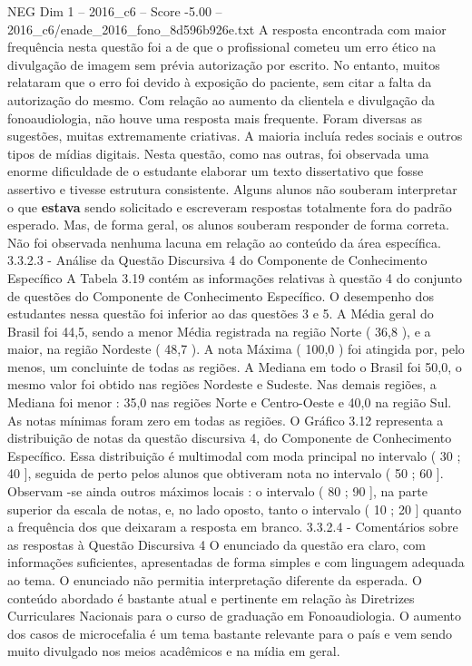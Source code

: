 \begin{textsample}{NEG Dim 1 – 2016\_c6 – Score -5.00 – 2016\_c6/enade\_2016\_fono\_8d596b926e.txt}
A resposta encontrada com maior frequência nesta questão foi a de que o profissional cometeu um erro ético na divulgação de imagem sem prévia autorização por escrito.
No entanto, muitos relataram que o erro foi devido à exposição do paciente, sem citar a falta da autorização do mesmo.
Com relação ao aumento da clientela e divulgação da fonoaudiologia, não houve uma resposta mais frequente.
Foram diversas as sugestões, muitas extremamente criativas.
A maioria incluía redes sociais e outros tipos de mídias digitais.
Nesta questão, como nas outras, foi observada uma enorme dificuldade de o estudante elaborar um texto dissertativo que fosse assertivo e tivesse estrutura consistente.
Alguns alunos não souberam interpretar o que \textbf{estava} sendo solicitado e escreveram respostas totalmente fora do padrão esperado.
Mas, de forma geral, os alunos souberam responder de forma correta.
Não foi observada nenhuma lacuna em relação ao conteúdo da área específica. 3.3.2.3 - Análise da Questão Discursiva 4 do Componente de Conhecimento Específico A Tabela 3.19 contém as informações relativas à questão 4 do conjunto de questões do Componente de Conhecimento Específico.
O desempenho dos estudantes nessa questão foi inferior ao das questões 3 e 5.
A Média geral do Brasil foi 44,5, sendo a menor Média registrada na região Norte ( 36,8 ), e a maior, na região Nordeste ( 48,7 ).
A nota Máxima ( 100,0 ) foi atingida por, pelo menos, um concluinte de todas as regiões.
A Mediana em todo o Brasil foi 50,0, o mesmo valor foi obtido nas regiões Nordeste e Sudeste.
Nas demais regiões, a Mediana foi menor : 35,0 nas regiões Norte e Centro-Oeste e 40,0 na região Sul.
As notas mínimas foram zero em todas as regiões.
O Gráfico 3.12 representa a distribuição de notas da questão discursiva 4, do Componente de Conhecimento Específico.
Essa distribuição é multimodal com moda principal no intervalo ( 30 ; 40 ], seguida de perto pelos alunos que obtiveram nota no intervalo ( 50 ; 60 ].
Observam -se ainda outros máximos locais : o intervalo ( 80 ; 90 ], na parte superior da escala de notas, e, no lado oposto, tanto o intervalo ( 10 ; 20 ] quanto a frequência dos que deixaram a resposta em branco. 3.3.2.4 - Comentários sobre as respostas à Questão Discursiva 4 O enunciado da questão era claro, com informações suficientes, apresentadas de forma simples e com linguagem adequada ao tema.
O enunciado não permitia interpretação diferente da esperada.
O conteúdo abordado é bastante atual e pertinente em relação às Diretrizes Curriculares Nacionais para o curso de graduação em Fonoaudiologia.
O aumento dos casos de microcefalia é um tema bastante relevante para o país e vem sendo muito divulgado nos meios acadêmicos e na mídia em geral.

\end{textsample}
